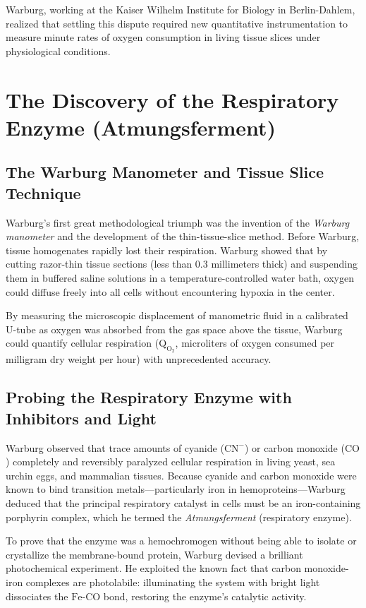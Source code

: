 Warburg, working at the Kaiser Wilhelm Institute for Biology in Berlin-Dahlem, realized that settling this dispute required new quantitative instrumentation to measure minute rates of oxygen consumption in living tissue slices under physiological conditions.

\section{The Discovery of the Respiratory Enzyme (Atmungsferment)}

\subsection{The Warburg Manometer and Tissue Slice Technique}

Warburg's first great methodological triumph was the invention of the \emph{Warburg manometer} and the development of the thin-tissue-slice method. Before Warburg, tissue homogenates rapidly lost their respiration. Warburg showed that by cutting razor-thin tissue sections (less than 0.3 millimeters thick) and suspending them in buffered saline solutions in a temperature-controlled water bath, oxygen could diffuse freely into all cells without encountering hypoxia in the center. 

By measuring the microscopic displacement of manometric fluid in a calibrated U-tube as oxygen was absorbed from the gas space above the tissue, Warburg could quantify cellular respiration ($\text{Q}_{\text{O}_2}$, microliters of oxygen consumed per milligram dry weight per hour) with unprecedented accuracy.

\subsection{Probing the Respiratory Enzyme with Inhibitors and Light}

Warburg observed that trace amounts of cyanide ($\text{CN}^-$) or carbon monoxide ($\text{CO}$) completely and reversibly paralyzed cellular respiration in living yeast, sea urchin eggs, and mammalian tissues. Because cyanide and carbon monoxide were known to bind transition metals—particularly iron in hemoproteins—Warburg deduced that the principal respiratory catalyst in cells must be an iron-containing porphyrin complex, which he termed the \emph{Atmungsferment} (respiratory enzyme).

To prove that the enzyme was a hemochromogen without being able to isolate or crystallize the membrane-bound protein, Warburg devised a brilliant photochemical experiment. He exploited the known fact that carbon monoxide-iron complexes are photolabile: illuminating the system with bright light dissociates the $\text{Fe-CO}$ bond, restoring the enzyme's catalytic activity. 

